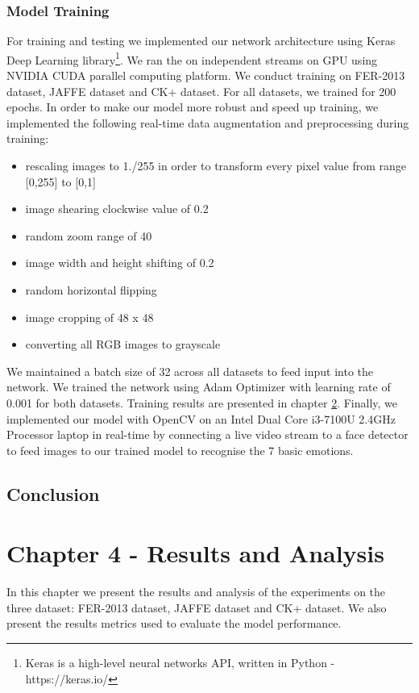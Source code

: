 \documentclass[master]{thesis-uestc}
\begin{document}
\subsection{Model Training}
For training and testing we implemented our network architecture using Keras Deep Learning library\footnote{Keras is a high-level neural networks API, written in Python - https://keras.io/}. We ran the on independent streams on GPU using NVIDIA CUDA parallel computing platform. We conduct training on FER-2013 dataset, JAFFE dataset and CK+ dataset. For all datasets, we trained for 200 epochs. In order to make our model more robust and speed up training, we implemented the following real-time data augmentation and preprocessing during training:
\begin{itemize}
 \item rescaling images to 1./255 in order to transform every pixel value from range [0,255] to [0,1]
 \item image shearing clockwise value of 0.2
 \item  random zoom range of 40
 \item  image width and height shifting of 0.2
 \item random horizontal flipping
 \item image cropping of 48 x 48
 \item converting all RGB images to grayscale
\end{itemize}
We maintained a batch size of 32 across all datasets to feed input into the network. We trained the network using Adam Optimizer \cite{DBLP:journals/corr/KingmaB14} with learning rate of 0.001 for both datasets. Training results are presented in chapter \ref{chp4}. Finally, we implemented our model with OpenCV on an Intel Dual Core i3-7100U 2.4GHz Processor laptop in real-time by connecting a live video stream to a face detector to feed images to our trained model to recognise the 7 basic emotions.

\section{Conclusion}

\chapter{Chapter 4 - Results and Analysis}\label{chp4}
In this chapter we present the results and analysis of the experiments on the three dataset: FER-2013 dataset, JAFFE dataset and CK+ dataset. We also present the results metrics used to evaluate the model performance.
\end{document}
